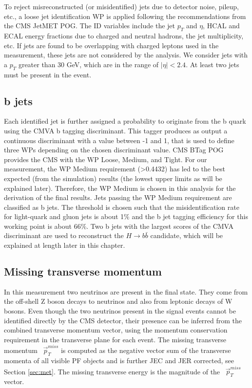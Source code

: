 To reject misreconstructed (or misidentified) jets due to detector noise, pileup, etc., a loose jet identification WP is applied following the recommendations from the CMS JetMET POG. The ID variables include the jet $p_T$ and $\eta$, HCAL and ECAL energy fractions due to charged and neutral hadrons, the jet multiplicity, etc. If jets are found to be overlapping with charged leptons used in the measurement, these jets are not considered by the analysis. We consider jets with a $p_T$ greater than 30 GeV, which are in the range of $|\eta| < 2.4$. At least two jets must be present in the event. 

\subsection{b jets}\label{sec:bjets}
Each identified jet is further assigned a probability to originate from the b quark using the CMVA b tagging discriminant. This tagger produces as output a continuous discriminant with a value between -1 and 1, that is used to define three WPs depending on the chosen discriminant value. CMS BTag POG provides the CMS with the WP Loose, Medium, and Tight. For our measurement, the WP Medium requirement (>0.4432) has led to the best expected (from the simulation) results (the lowest upper limits as will be explained later). Therefore, the WP Medium is chosen in this analysis for the derivation of the final results. Jets passing the WP Medium requirement are classified as b jets. The threshold is chosen such that the misidentification rate for light-quark and gluon jets is about 1$\%$ and the b jet tagging efficiency for this working point is about 66$\%$. Two b jets with the largest scores of the CMVA discriminant are used to reconstruct the $H \to b\bar{b}$ candidate, which will be explained at length later in this chapter. 

\subsection{Missing transverse momentum}
In this measurement two neutrinos are present in the final state. They come from the off-shell Z boson decays to neutrinos and also from leptonic decays of W bosons. Even though the two neutrinos present in the signal events cannot be identified directly by the CMS detector, their presence can be inferred from the combined transverse momentum vector, using the momentum conservation requirement in the transverse plane for each event. The missing transverse momentum ~$\vec{p}^{miss}_T$ is computed as the negative vector sum of the transverse momenta of all visible PF objects and is further JEC and JER corrected, see Section \ref{sec:met}. The missing transverse energy \ETslash is the magnitude of the ~$\vec{p}^{miss}_T$ vector. 

